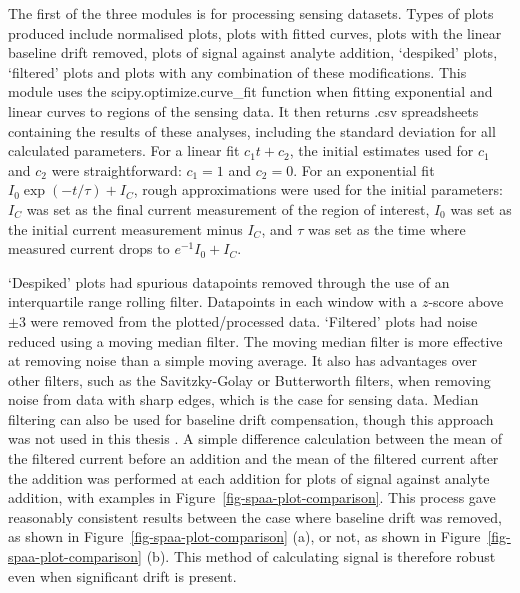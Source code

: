 \documentclass[
  a4paper,
]{scrbook}
\begin{document}
The first of the three modules is for processing sensing datasets. Types
of plots produced include normalised plots, plots with fitted curves,
plots with the linear baseline drift removed, plots of signal against
analyte addition, `despiked' plots, `filtered' plots and plots with any
combination of these modifications. This module uses the
scipy.optimize.curve\_fit function when fitting exponential and linear
curves to regions of the sensing data. It then returns .csv spreadsheets
containing the results of these analyses, including the standard
deviation for all calculated parameters. For a linear fit
\(c_1t + c_2\), the initial estimates used for \(c_1\) and \(c_2\) were
straightforward: \(c_1=1\) and \(c_2=0\). For an exponential fit
\(I_0\exp{(-t/\tau)} + I_C\), rough approximations were used for the
initial parameters: \(I_C\) was set as the final current measurement of
the region of interest, \(I_0\) was set as the initial current
measurement minus \(I_C\), and \(\tau\) was set as the time where
measured current drops to \(e^{-1}I_0 + I_C\).

`Despiked' plots had spurious datapoints removed through the use of an
interquartile range rolling filter. Datapoints in each window with a
\(z\)-score above \(\pm 3\) were removed from the plotted/processed
data. `Filtered' plots had noise reduced using a moving median filter.
The moving median filter is more effective at removing noise than a
simple moving average. It also has advantages over other filters, such
as the Savitzky-Golay or Butterworth filters, when removing noise from
data with sharp edges, which is the case for sensing data. Median
filtering can also be used for baseline drift compensation, though this
approach was not used in this thesis \autocite{Stone2011}. A simple
difference calculation between the mean of the filtered current before
an addition and the mean of the filtered current after the addition was
performed at each addition for plots of signal against analyte addition,
with examples in Figure~\ref{fig-spaa-plot-comparison}. This process
gave reasonably consistent results between the case where baseline drift
was removed, as shown in Figure~\ref{fig-spaa-plot-comparison} (a), or
not, as shown in Figure~\ref{fig-spaa-plot-comparison} (b). This method
of calculating signal is therefore robust even when significant drift is
present.
\end{document}
